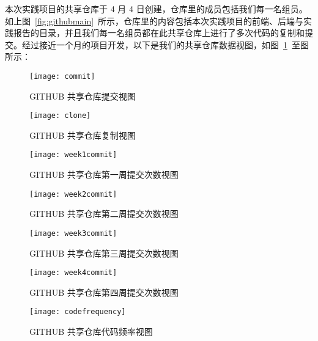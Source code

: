 本次实践项目的共享仓库于 4 月 4 日创建，仓库里的成员包括我们每一名组员。如上图~\ref{fig:githubmain}~所示，仓库里的内容包括本次实践项目的前端、后端与实践报告的目录，并且我们每一名组员都在此共享仓库上进行了多次代码的复制和提交。经过接近一个月的项目开发，以下是我们的共享仓库数据视图，如图~\ref{fig:commit}~至图所示：

\begin{figure}[htbp]
    \centering
    \texttt{[image: commit]}
    \caption{GITHUB 共享仓库提交视图}\label{fig:commit}
    \vspace{\baselineskip}
\end{figure}
\begin{figure}[htbp]
    \centering
    \texttt{[image: clone]}
    \caption{GITHUB 共享仓库复制视图}\label{fig:clone}
    \vspace{\baselineskip}
\end{figure}
\begin{figure}[htbp]
    \centering
    \texttt{[image: week1commit]}
    \caption{GITHUB 共享仓库第一周提交次数视图}\label{fig:week1commit}
    \vspace{\baselineskip}
\end{figure}
\begin{figure}[htbp]
    \centering
    \texttt{[image: week2commit]}
    \caption{GITHUB 共享仓库第二周提交次数视图}\label{fig:week2commit}
    \vspace{\baselineskip}
\end{figure}
\begin{figure}[htbp]
    \centering
    \texttt{[image: week3commit]}
    \caption{GITHUB 共享仓库第三周提交次数视图}\label{fig:week3commit}
    \vspace{\baselineskip}
\end{figure}
\begin{figure}[htbp]
    \centering
    \texttt{[image: week4commit]}
    \caption{GITHUB 共享仓库第四周提交次数视图}\label{fig:week4commit}
    \vspace{\baselineskip}
\end{figure}
\begin{figure}[htbp]
    \centering
    \texttt{[image: codefrequency]}
    \caption{GITHUB 共享仓库代码频率视图}\label{fig:codefrequency}
    \vspace{\baselineskip}
\end{figure}

